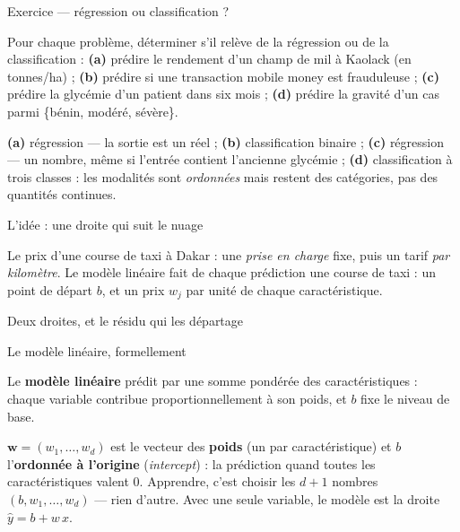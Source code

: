 \documentclass[aspectratio=169,11pt]{beamer}
\begin{document}
\begin{frame}{Exercice — régression ou classification ?}
\begin{ucadrec}[Énoncé]
{\small Pour chaque problème, déterminer s'il relève de la régression ou de la classification : \textbf{(a)} prédire le rendement d'un champ de mil à Kaolack (en tonnes/ha) ; \textbf{(b)} prédire si une transaction mobile money est frauduleuse ; \textbf{(c)} prédire la glycémie d'un patient dans six mois ; \textbf{(d)} prédire la gravité d'un cas parmi \{bénin, modéré, sévère\}.}
\end{ucadrec}
\pause
\begin{ucadex}[Correction]
{\small \textbf{(a)} régression — la sortie est un réel ; \textbf{(b)} classification binaire ; \textbf{(c)} régression — un nombre, même si l'entrée contient l'ancienne glycémie ; \textbf{(d)} classification à trois classes : les modalités sont \emph{ordonnées} mais restent des catégories, pas des quantités continues.}
\end{ucadex}
\end{frame}

\begin{frame}{L'idée : une droite qui suit le nuage}
\begin{ucadfront}[Analogie]
{\small Le prix d'une course de taxi à Dakar : une \emph{prise en charge} fixe, puis un tarif \emph{par kilomètre}. Le modèle linéaire fait de chaque prédiction une course de taxi : un point de départ $b$, et un prix $w_j$ par unité de chaque caractéristique.}
\end{ucadfront}
\end{frame}

\begin{frame}{Deux droites, et le résidu qui les départage}
\end{frame}

\begin{frame}{Le modèle linéaire, formellement}
\begin{ucaddef}[Définition]
{\small Le \textbf{modèle linéaire} prédit par une somme pondérée des caractéristiques : chaque variable contribue proportionnellement à son poids, et $b$ fixe le niveau de base.}
\end{ucaddef}
{\small $\mathbf{w} = (w_1,\dots,w_d)$ est le vecteur des \textbf{poids} (un par caractéristique) et $b$ l'\textbf{ordonnée à l'origine} (\emph{intercept}) : la prédiction quand toutes les caractéristiques valent $0$. Apprendre, c'est choisir les $d+1$ nombres $(b, w_1, \dots, w_d)$ — rien d'autre. Avec une seule variable, le modèle est la droite $\hat y = b + w\,x$.}
\end{frame}
\end{document}
